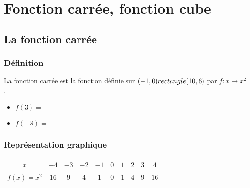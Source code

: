 



\chapter{Fonction carrée, fonction cube}



\section{La fonction carrée}
\subsection{Définition}
  \begin{minipage}[c]{0.6\linewidth}
\begin{Définition}
La fonction carrée est la fonction définie sur $(-1,0) rectangle (10,6)$ par $f:x\mapsto x^2$.
\end{Définition}
  \end{minipage} \hfill
  \begin{minipage}[c]{0.33\linewidth}
  \begin{Exemple}
  \leavevmode\vspace{-\baselineskip}
\begin{itemize}[label=\textcolor{Couleur8}{$\bullet$}]
\item $f(3)=$ \ligne 
\item $f(-8)=$ \ligne 
\end{itemize}
\end{Exemple}
  \end{minipage}


\subsection{Représentation graphique}
\begin{center}

\begin{tabular}{|c|c|c|c|c|c|c|c|c|c|}
\arrayrulecolor{Couleur6} \hline
$x$ & $-4$ & $-3$ & $-2$ & $-1$ & $0$ & $1$ & $2$ & $3$ & $4$\\
\hline
$f(x)=x^2$ & $16$ & $9$ & $4$ & $1$ & $0$ & $1$ & $4$ & $9$ & $16$\\
\hline

\end{tabular}
\end{center}

